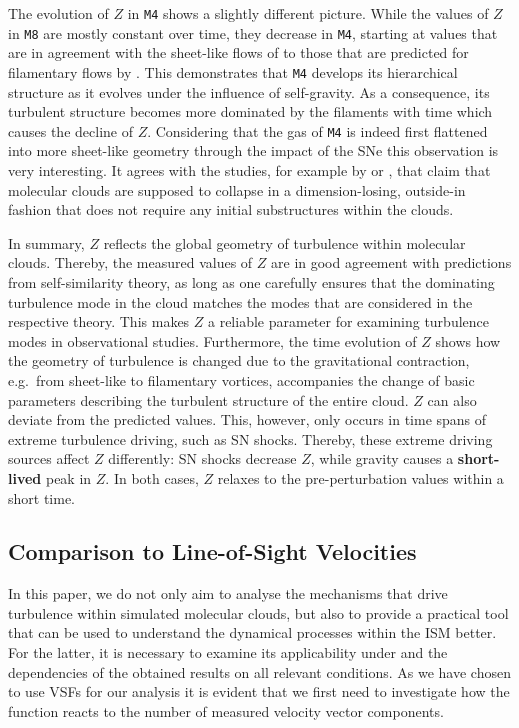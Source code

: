 The evolution of $Z$ in \texttt{M4} shows a slightly different picture.
While the values of $Z$ in \texttt{M8} are mostly constant over time, they decrease in \texttt{M4}, starting at values that are in agreement with the sheet-like flows of \citet{Boldyrev2002} to those that are predicted for filamentary flows by \citet{She1994}. 
This demonstrates that \texttt{M4} develops its hierarchical structure as it evolves under the influence of self-gravity. 
As a consequence, its turbulent structure becomes more dominated by the filaments with time which causes the decline of $Z$.
Considering that the gas of \texttt{M4} is indeed first flattened into more sheet-like geometry through the impact of the SNe  this observation is very interesting.
It agrees with the studies, for example by \citet{Lin1965} or \citet{McKee2007}, that claim that molecular clouds are supposed to collapse in a dimension-losing, outside-in fashion that does not require any initial substructures within the clouds.

In summary, $Z$ reflects the global geometry of turbulence within molecular clouds. 
Thereby, the measured values of $Z$ are in good agreement with predictions from self-similarity theory, as long as one carefully ensures that the dominating turbulence mode in the cloud matches the modes that are considered in the respective theory.
This makes $Z$ a reliable parameter for examining turbulence modes in observational studies.
Furthermore, the time evolution of $Z$ shows how the geometry of turbulence is changed due to the gravitational contraction, e.g.~from sheet-like to filamentary vortices, accompanies the change of basic parameters describing the turbulent structure of the entire cloud. 
$Z$ can also deviate from the predicted values. 
This, however, only occurs in time spans of extreme turbulence driving, such as SN shocks.
Thereby, these extreme driving sources affect $Z$ differently:
SN shocks decrease $Z$, while gravity causes a \textbf{short-lived} peak in $Z$.
In both cases, $Z$ relaxes to the pre-perturbation values within a short time.




\subsection{Comparison to Line-of-Sight Velocities}\label{discussion:1d}

In this paper, we do not only aim to analyse the mechanisms that drive turbulence within simulated molecular clouds, but also to provide a practical tool that can be used to understand the dynamical processes within the ISM better.
For the latter, it is necessary to examine its applicability under and the dependencies of the obtained results on all relevant conditions. 
As we have chosen to use VSFs for our analysis it is evident that we first need to investigate how the function reacts to the number of measured velocity vector components. 

